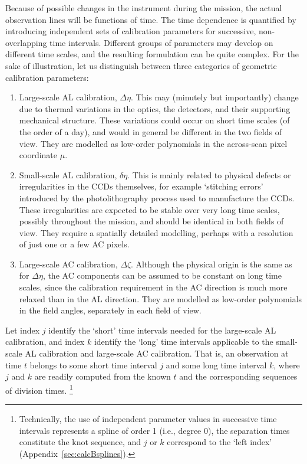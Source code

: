 \documentclass[structabstract]{aa}
\begin{document}
Because of possible changes in the instrument during the mission, the actual
observation lines will be functions of time. The time dependence is quantified
by introducing independent sets of calibration parameters for successive,
non-overlapping time intervals. Different groups of parameters may develop
on different time scales, and the resulting formulation can be quite complex.
For the sake of illustration, let us distinguish between three categories of
geometric calibration parameters:
\begin{enumerate}
\item
Large-scale AL calibration, $\Delta\eta$. This may 
(minutely but importantly) change due to
thermal variations in the optics, the detectors, and their supporting mechanical
structure. These variations could occur on short time scales (of the order of a
day), and would in general be different in the two fields of view. They are
modelled as low-order polynomials in the across-scan pixel coordinate $\mu$.
\item
Small-scale AL calibration, $\delta\eta$. This is mainly related to physical
defects or irregularities in the CCDs themselves, for example `stitching errors'
introduced by the photolithography process used to manufacture the CCDs. These
irregularities are expected to be stable over very long time scales, possibly
throughout the mission, and should be identical in both fields of view. They
require a spatially detailed modelling, perhaps with a resolution of just one
or a few AC pixels.
\item Large-scale AC calibration, $\Delta\zeta$. Although the physical origin
is the same as for $\Delta\eta$, the AC components can be assumed to be constant
on long time scales, since the calibration requirement in the AC direction
is much more relaxed than in the AL direction. They are modelled as low-order
polynomials in the field angles, separately in each field of view.
\end{enumerate}
Let index $j$ identify the `short' time intervals needed for the large-scale
AL calibration, and index $k$ identify the `long' time intervals applicable
to the small-scale AL calibration and large-scale AC calibration. That is,
an observation at time $t$ belongs to some short time interval $j$ and some
long time interval $k$, where $j$ and $k$ are readily computed from the known
$t$ and the corresponding sequences of division times.%
\footnote{Technically, the use of independent parameter values in successive
time intervals represents a spline of order 1 (i.e., degree 0), the separation times constitute
the knot sequence, and $j$ or $k$ correspond to the `left index'
(Appendix~\ref{sec:calcBsplines}).}
\end{document}
